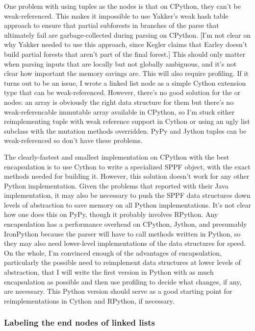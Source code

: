\documentclass[12pt]{article}
\begin{document}
One problem with using tuples as the nodes is that on CPython, they
can't be weak-referenced.  This makes it impossible to use Yakker's
weak hash table approach to ensure that partial subforests in branches
of the parse that ultimately fail are garbage-collected during parsing
on CPython.  [I'm not clear on why Yakker needed to use this approach,
since Kegler claims that Earley doesn't build partial forests that
aren't part of the final forest.]  This should only matter when
parsing inputs that are locally but not globally ambiguous, and it's
not clear how important the memory savings are.  This will also
require profiling.  If it turns out to be an issue, I wrote a linked
list node as a simple Cython extension type that can be
weak-referenced.  However, there's no good solution for the or nodes:
an array is obviously the right data structure for them but there's no
weak-referencable immutable array available in CPython, so I'm stuck
either reimplementing tuple with weak reference support in Cython or
using an ugly list subclass with the mutation methods overridden.
PyPy and Jython tuples can be weak-referenced so don't have these
problems.

The clearly-fastest and smallest implementation on CPython with the
best encapsulation is to use Cython to write a specialized SPPF
object, with the exact methods needed for building it.  However, this
solution doesn't work for any other Python implementation.  Given the
problems that \textcite{gll3} reported with their Java implementation,
it may also be necessary to push the SPPF data structures down levels
of abstraction to save memory on all Python implementations.  It's not
clear how one does this on PyPy, though it probably involves RPython.
Any encapsulation has a performance overhead on CPython, Jython, and
presumably IronPython because the parser will have to call methods
written in Python, so they may also need lower-level implementations
of the data structures for speed.  On the whole, I'm convinced enough
of the advantages of encapsulation, particularly the possible need to
reimplement data structures at lower levels of abstraction, that I
will write the first version in Python with as much encapsulation as
possible and then use profiling to decide what changes, if any, are
necessary.  This Python version should serve as a good starting point
for reimplementations in Cython and RPython, if necessary.

\subsubsection{Labeling the end nodes of linked lists}
\label{sec:end_node_labels}
\end{document}
